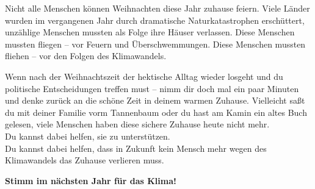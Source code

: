 \documentclass[parskip]{scrlttr2}
\begin{document}
Nicht alle Menschen können Weihnachten diese Jahr zuhause feiern.
Viele Länder wurden im vergangenen Jahr durch dramatische Naturkatastrophen
erschüttert, unzählige Menschen mussten als Folge ihre Häuser verlassen.
Diese Menschen mussten fliegen – vor Feuern und Überschwemmungen.
Diese Menschen mussten fliehen – vor den Folgen des Klimawandels.

Wenn nach der Weihnachtszeit der hektische Alltag wieder losgeht und du
politische Entscheidungen treffen must – nimm dir doch mal ein paar Minuten und
denke zurück an die schöne Zeit in deinem warmen Zuhause. Vielleicht saßt du
mit deiner Familie vorm Tannenbaum oder du hast am Kamin ein altes Buch
gelesen, viele Menschen haben diese sichere Zuhause heute nicht mehr.\\
Du kannst dabei helfen, sie zu unterstützen. \\
Du kannst dabei helfen, dass in Zukunft kein Mensch mehr wegen des Klimawandels
das Zuhause verlieren muss.

\textbf{
\large Stimm im nächsten Jahr für das Klima!}

\textbf{
  \large
}
\rightline{
  \schnorkel \textcolor{MyRed}{MY_NAME}}
\end{document}
